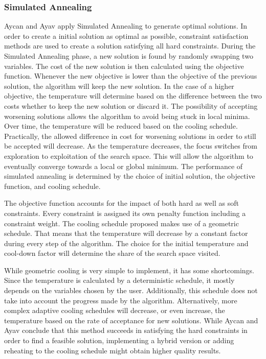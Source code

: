 \subsubsection{Simulated Annealing}

Aycan and Ayav \cite{aycan2009} apply Simulated Annealing \cite{kirkpatrick1983} to generate optimal solutions. In order to create a initial solution as optimal as possible, constraint satisfaction methods are used to create a solution satisfying all hard constraints. During the Simulated Annealing phase, a new solution is found by randomly swapping two variables. The cost of the new solution is then calculated using the objective function. Whenever the new objective is lower than the objective of the previous solution, the algorithm will keep the new solution. In the case of a higher objective, the temperature will determine based on the difference between the two costs whether to keep the new solution or discard it. The possibility of accepting worsening solutions allows the algorithm to avoid being stuck in local minima. Over time, the temperature will be reduced based on the cooling schedule. Practically, the allowed difference in cost for worsening solutions in order to still be accepted will decrease. As the temperature decreases, the focus switches from exploration to exploitation of the search space. This will allow the algorithm to eventually converge towards a local or global minimum. The performance of simulated annealing is determined by the choice of initial solution, the objective function, and cooling schedule. 

The objective function accounts for the impact of both hard as well as soft constraints. Every constraint is assigned its own penalty function including a constraint weight. The cooling schedule proposed makes use of a geometric schedule. That means that the temperature will decrease by a constant factor during every step of the algorithm. The choice for the initial temperature and cool-down factor will determine the share of the search space visited. 

While geometric cooling is very simple to implement, it has some shortcomings. Since the temperature is calculated by a deterministic schedule, it mostly depends on the variables chosen by the user. Additionally, this schedule does not take into account the progress made by the algorithm. Alternatively, more complex adaptive cooling schedules will decrease, or even increase, the temperature based on the rate of acceptance for new solutions. While Aycan and Ayav conclude that this method succeeds in satisfying the hard constraints in order to find a feasible solution, implementing a hybrid version or adding reheating to the cooling schedule might obtain higher quality results.

